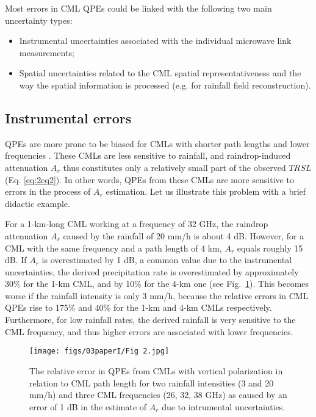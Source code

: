 \documentclass{ctuthesis}\usepackage[]{graphicx}\usepackage[]{color}
\begin{document}
Most errors in CML QPEs could be linked with the following two main uncertainty types: 
\begin{itemize}
        \item Instrumental uncertainties associated with the individual microwave link measurements; 
        \item Spatial uncertainties related to the CML spatial representativeness and the way the spatial information is processed (e.g. for rainfall field reconstruction).
\end{itemize}


\subsection{Instrumental errors} \label{InstErr}

QPEs are more prone to be biased for CMLs with shorter path lengths and lower frequencies \citep{leijnseMicrowaveLinkRainfall2008}. These CMLs are less sensitive to rainfall, and raindrop-induced attenuation $A_r$ thus constitutes only a relatively small part of the observed $T\!R\!S\!L$ (Eq. \ref{eq:2eq2}). In other words, QPEs from these CMLs are more sensitive to errors in the process of $A_r$ estimation. Let us illustrate this problem with a brief didactic example. 

For a 1-km-long CML working at a frequency of 32 GHz, the raindrop attenuation $A_r$ caused by the rainfall of 20 mm/h is about 4 dB. However, for a CML with the same frequency and a path length of 4 km, $A_r$ equals roughly 15 dB. If $A_r$ is overestimated by 1 dB, a common value due to the instrumental uncertainties, the derived precipitation rate is overestimated by approximately 30\% for the 1-km CML, and by 10\% for the 4-km one (see Fig.~\ref{2The1}). This becomes worse if the rainfall intensity is only 3 mm/h, because the relative errors in CML QPEs rise to 175\% and 40\% for the 1-km and 4-km CMLs respectively. Furthermore, for low rainfall rates, the derived rainfall is very sensitive to the CML frequency, and thus higher errors are associated with lower frequencies.

\begin{figure}[h]
\begin{center}
\texttt{[image: figs/03paperI/Fig 2.jpg]}
\caption{The relative error in QPEs from CMLs with vertical polarization in relation to CML path length for two rainfall intensities (3 and 20 mm/h) and three CML frequencies (26, 32, 38 GHz) as caused by an error of 1 dB in the estimate of $A_r$ due to intrumental uncertainties.} \label{2The1}
\end{center}
\end{figure}
\end{document}
